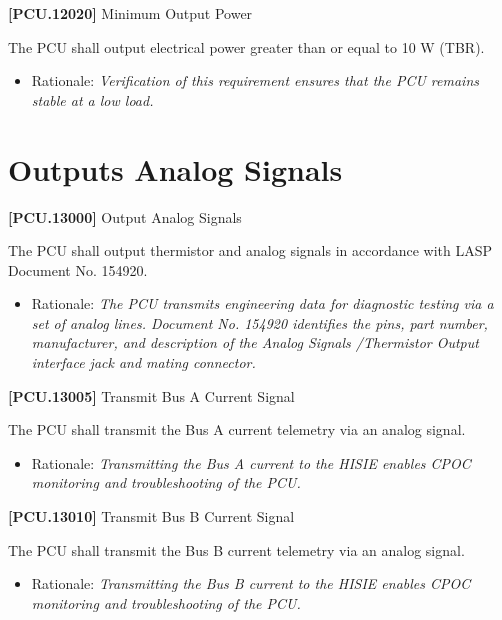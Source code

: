 \textbf{[PCU.12020]} Minimum Output Power

The \gls{PCU} shall output electrical power greater than or equal to 10 W (TBR\label{tbx_6}).

\begin{itemize}
\item{} Rationale: \emph{Verification of this requirement ensures that the PCU remains stable at a low load.}

\end{itemize}

\section{Outputs Analog Signals}
\label{outputsanalogsignals}

\textbf{[PCU.13000]} Output Analog Signals

The \gls{PCU} shall output thermistor and analog signals in accordance with \gls{LASP} Document No. 154920.

\begin{itemize}
\item{} Rationale: \emph{The PCU transmits engineering data for diagnostic testing via a set of analog lines. Document No. 154920 identifies the pins, part number, manufacturer, and description of the Analog Signals \slash  Thermistor Output interface jack and mating connector.}

\end{itemize}

\textbf{[PCU.13005]} Transmit Bus A Current Signal

The \gls{PCU} shall transmit the Bus A current telemetry via an analog signal.

\begin{itemize}
\item{} Rationale: \emph{Transmitting the Bus A current to the HISIE enables CPOC monitoring and troubleshooting of the PCU.}

\end{itemize}

\textbf{[PCU.13010]} Transmit Bus B Current Signal

The \gls{PCU} shall transmit the Bus B current telemetry via an analog signal.

\begin{itemize}
\item{} Rationale: \emph{Transmitting the Bus B current to the HISIE enables CPOC monitoring and troubleshooting of the PCU.}

\end{itemize}

